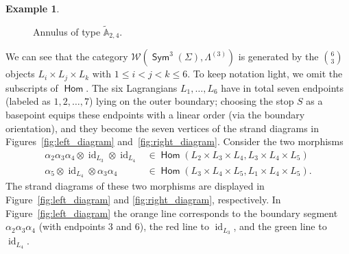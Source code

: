 \documentclass[a4paper, reqno, 11pt]{amsart}
\theoremstyle{definition}
\newtheorem{example}[theorem]{Example}
\newcommand{\opname}[1]{\operatorname{\mathsf{#1}}}
\newcommand{\Id}{\operatorname{id}}
\newcommand{\Hom}{\opname{Hom}}
\newcommand{\Sym}{\opname{Sym}}
\begin{document}
\begin{example}
\begin{figure}[htbp]
			\caption{Annulus of type $\widetilde{\mathbb A}_{2,4}$.}
			\label{fig:annulus-2-4}
		\end{figure}
		
		We can see that the category $\mathcal{W}(\Sym^3(\Sigma), \Lambda^{(3)})$ is generated by the $\binom{6}{3}$ objects $L_{i}\times L_{j}\times L_{k}$ with $1\leq i < j<k\leq 6$. To keep notation light, we omit the subscripts of $\Hom$. The six Lagrangians $L_{1},\dots ,L_{6}$ have in total seven endpoints (labeled as $1, 2, \dots, 7$) lying on the outer boundary; choosing the stop $S$ as a basepoint equips these endpoints with a linear order (via the boundary orientation), and they become the seven vertices of the strand diagrams in Figures~\ref{fig:left_diagram} and~\ref{fig:right_diagram}. Consider the two morphisms  
		\begin{align*}
			\alpha_2 \alpha_3 \alpha_4 \otimes \Id_{L_3} \otimes \Id_{L_4} & \in \Hom(L_{2}\times L_{3}\times L_{4},L_{3}\times L_{4}\times L_{5})\\ \alpha_5\otimes \Id_{L_4}\otimes \alpha_3 \alpha_4 & \in \Hom(L_{3}\times L_{4}\times L_{5},L_{1}\times L_{4}\times L_{5}).
		\end{align*} 
		The strand diagrams of these two morphisms are displayed in Figure~\ref{fig:left_diagram} and  \ref{fig:right_diagram}, respectively. In Figure~\ref{fig:left_diagram} the orange line corresponds to the boundary segment  $\alpha_2\alpha_3\alpha_4$ (with endpoints $3$ and $6$), the red line to $\Id_{L_3}$, and the green line to $\Id_{L_4}$.
		

\end{example}
\end{document}
